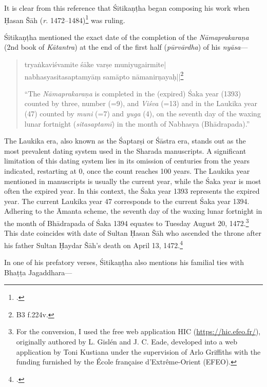 It is clear from this reference that Śitikaṇṭha began composing his work when Ḥasan Šāh (\emph{r.} 1472--1484)\footcite[109]{Hasan2024} was ruling. 

Śitikaṇṭha mentioned the exact date of the completion of the \emph{Nāmaprakaraṇa} (2nd book of \emph{Kātantra}) at the end of the first half (\emph{pūrvārdha}) of his \emph{nyāsa}---

\begin{quote}
	

\textsanskrit{tryaṅkaviśvamite śāke varṣe muniyugairmite|\\
nabhasyasitasaptamyāṃ samāpto nāmanirṇayaḥ||}\footnote{\gls{B3} f.224v.}

“The \emph{Nāmaprakaraṇa} is completed in the (expired) Śaka year (1393) counted by three, number (=9), and \emph{Viśva} (=13) and in the Laukika year (47) counted by \emph{muni} (=7) and \emph{yuga} (4), on the seventh day of the waxing lunar fortnight (\emph{sitasaptamī}) in the month of Nabhasya (Bhādrapada).”

\end{quote}
The Laukika era, also known as the Śaptarṣi or Śāstra era, stands out as the most prevalent dating system used in the Sharada manuscripts. A significant limitation of this dating system lies in its omission of centuries from the years indicated, restarting at 0, once the count reaches 100 years. The Laukika year mentioned in manuscripts is usually the current year, while the Śaka year is most often the expired year. In this context, the Śaka year 1393 represents the expired year. The current Laukika year 47 corresponds to the current Śaka year 1394. Adhering to the Āmanta scheme, the seventh day of the waxing lunar fortnight in the month of Bhādrapada of Śaka 1394 equates to Tuesday August 20, 1472.\footnote{For the conversion, I used the free web 			
	application HIC (\url{https://hic.efeo.fr/}), originally authored by L. Gislén and J. C. Eade, developed into a web application by Toni Kustiana under the supervision of Arlo Griffiths with the funding furnished by the École française d’Extrême-Orient (EFEO).}
This date coincides with date of Sultan Ḥasan Šāh who ascended the throne after his father Sultan Ḥaydar Šāh's death on April 13, 1472.\footcite[108]{Hasan2024} 

In one of his prefatory verses, Śitikaṇṭha also mentions his familial ties with Bhaṭṭa Jagaddhara---

